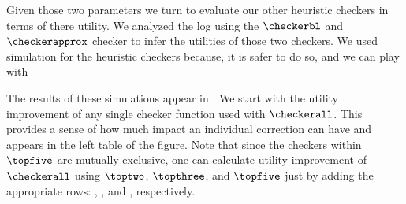 Given those two parameters we turn to evaluate our other heuristic
checkers in terms of there utility.  We analyzed the log using the
$\checkerbl$ and $\checkerapprox$ checker to infer the utilities of
those two checkers. We used simulation for the heuristic checkers
because,  it is safer to do so, and we can play with


 

The results of these simulations appear in . 
We start with the utility improvement of any single checker function
used with $\checkerall$. This provides a sense of how much impact an individual
correction can have and appears in the left table of the figure. 
Note that since the checkers within $\topfive$ are mutually exclusive, one can
calculate utility improvement of $\checkerall$ using $\toptwo$, $\topthree$, and
$\topfive$ just by adding the appropriate rows: , , and
, respectively.


